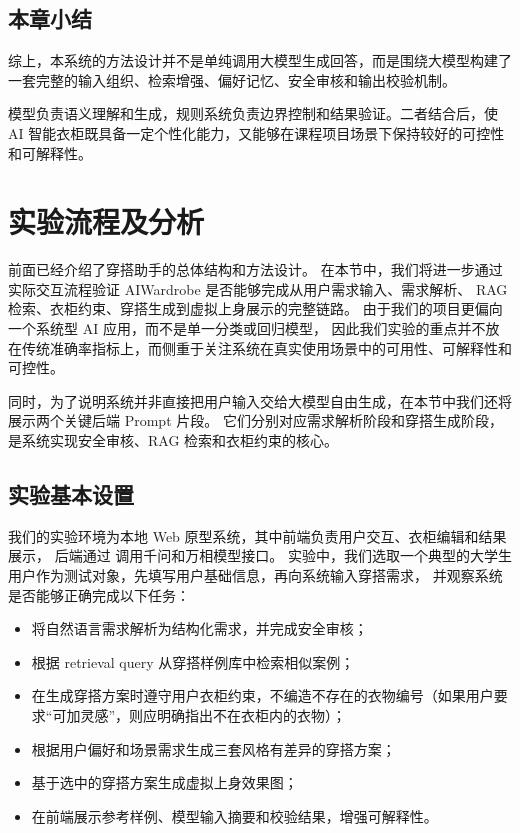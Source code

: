 \documentclass{applemlr}
\begin{document}
\subsection{本章小结}

综上，本系统的方法设计并不是单纯调用大模型生成回答，而是围绕大模型构建了一套完整的输入组织、检索增强、偏好记忆、安全审核和输出校验机制。

模型负责语义理解和生成，规则系统负责边界控制和结果验证。二者结合后，使 AI 智能衣柜既具备一定个性化能力，又能够在课程项目场景下保持较好的可控性和可解释性。


\section{实验流程及分析}

前面已经介绍了穿搭助手的总体结构和方法设计。
在本节中，我们将进一步通过实际交互流程验证 AIWardrobe 是否能够完成从用户需求输入、需求解析、
RAG 检索、衣柜约束、穿搭生成到虚拟上身展示的完整链路。
由于我们的项目更偏向一个系统型 AI 应用，而不是单一分类或回归模型，
因此我们实验的重点并不放在传统准确率指标上，而侧重于关注系统在真实使用场景中的可用性、可解释性和可控性。

同时，为了说明系统并非直接把用户输入交给大模型自由生成，在本节中我们还将展示两个关键后端 Prompt 片段。
它们分别对应需求解析阶段和穿搭生成阶段，是系统实现安全审核、RAG 检索和衣柜约束的核心。

\subsection{实验基本设置}

我们的实验环境为本地 Web 原型系统，其中前端负责用户交互、衣柜编辑和结果展示，
后端通过  调用千问和万相模型接口。
实验中，我们选取一个典型的大学生用户作为测试对象，先填写用户基础信息，再向系统输入穿搭需求，
并观察系统是否能够正确完成以下任务：

\begin{itemize}
\item 将自然语言需求解析为结构化需求，并完成安全审核；
\item 根据 retrieval query 从穿搭样例库中检索相似案例；
\item 在生成穿搭方案时遵守用户衣柜约束，不编造不存在的衣物编号（如果用户要求“可加灵感”，则应明确指出不在衣柜内的衣物）；
\item 根据用户偏好和场景需求生成三套风格有差异的穿搭方案；
\item 基于选中的穿搭方案生成虚拟上身效果图；
\item 在前端展示参考样例、模型输入摘要和校验结果，增强可解释性。
\end{itemize}
\end{document}
